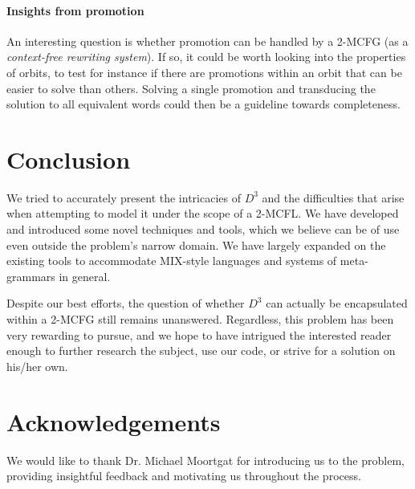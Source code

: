 \documentclass[nonatbib,numbers,10pt]{llncs}
\begin{document}
\paragraph{\textbf{Insights from promotion}}
An interesting question is whether promotion can be handled by a 2-MCFG (as a \textit{context-free rewriting system}). If so, it could be worth looking into the properties of orbits, to test for instance if there are promotions within an orbit that can be easier to solve than others. Solving a single promotion and transducing the solution to all equivalent words could then be a guideline towards completeness. 

\section{Conclusion}
We tried to accurately present the intricacies of $D^3$ and the difficulties that arise when attempting to model it under the scope of a 2-MCFL. We have developed and introduced some novel techniques and tools, which we believe can be of use even outside the problem's narrow domain. We have largely expanded on the existing tools to accommodate MIX-style languages and systems of meta-grammars in general.

Despite our best efforts, the question of whether $D^3$ can actually be encapsulated within a 2-MCFG still remains unanswered. Regardless, this problem has been very rewarding to pursue, and we hope to have intrigued the interested reader enough to further research the subject, use our code, or strive for a solution on his/her own.

\section*{Acknowledgements}
We would like to thank Dr. Michael Moortgat for introducing us to the problem, providing insightful feedback and motivating us throughout the process.




\end{document}
